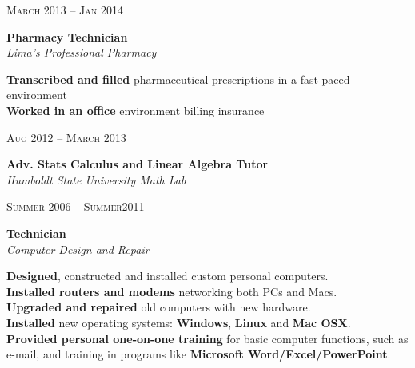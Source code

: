 \documentclass[10pt]{article} %
\begin{document}
{\begin{minipage}[t]{0.5\textwidth}

{\raggedleft\textsc{March 2013 -- Jan 2014}\par}

{\raggedright\large \textbf{Pharmacy Technician}\\
\textit{Lima's Professional Pharmacy}\\[5pt]}

\normalsize{\textbf{Transcribed and filled} pharmaceutical prescriptions in a fast paced environment\\
 \textbf{Worked in an office} environment billing insurance}\\


{\raggedleft\textsc{Aug 2012 -- March 2013}\par}

{\raggedright\large \textbf{Adv. Stats Calculus and Linear Algebra Tutor}\\
\textit{Humboldt State University Math Lab}\\[5pt]}

\normalsize{\textbf{}

{\raggedleft\textsc{Summer 2006 -- Summer2011}\par}

{\raggedright\large \textbf{Technician}\\
\textit{Computer Design and Repair}\\[5pt]}
\normalsize{\textbf{Designed}, constructed and installed custom personal computers.\\
\textbf{Installed routers and modems} networking both PCs and Macs. \\
\textbf{Upgraded and repaired} old computers with new hardware. \\
\textbf{Installed} new operating systems: \textbf{Windows}, \textbf{Linux} and \textbf{Mac OSX}.\\
\textbf{Provided personal one-on-one training} for basic computer functions, such as e-mail, and training in programs like \textbf{Microsoft Word/Excel/PowerPoint}. }\\


}
\end{minipage}}
\end{document}
